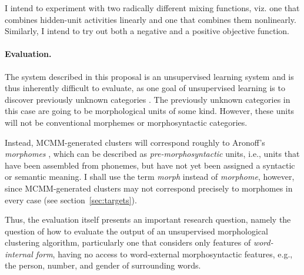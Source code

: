 I intend to experiment with two radically different mixing functions, 
viz. one that combines hidden-unit activities linearly and one that combines them nonlinearly.
Similarly, I intend to try out 
both a negative and a positive %
objective function. %

\paragraph{Evaluation.} The system described in this proposal is an unsupervised learning system and is thus inherently difficult to evaluate, as one goal of unsupervised learning is to discover previously unknown categories \citep{parsons:2004}.
The previously unknown categories in this case are going to be morphological units of some kind.
However, these units will not be conventional morphemes or morphosyntactic categories. 

Instead, MCMM-generated clusters will correspond roughly to Aronoff's 
\emph{morphomes} \citep{aronoff:1994}, which can be described as \emph{pre-morphosyntactic} units, i.e.,
units that have been assembled from phonemes, but have not yet been assigned 
a syntactic or semantic meaning. I shall use the term \emph{morph} instead of 
\emph{morphome}, however, since MCMM-generated clusters may not correspond 
precisely to morphomes in every case (see section~\ref{sec:targets}).

Thus, the evaluation itself presents an important research question, namely the question of how to evaluate the output of an unsupervised morphological clustering algorithm, particularly one that considers only features of \emph{word-internal form}, having no access to word-external morphosyntactic features, e.g., the person, number, and gender of  surrounding words.

